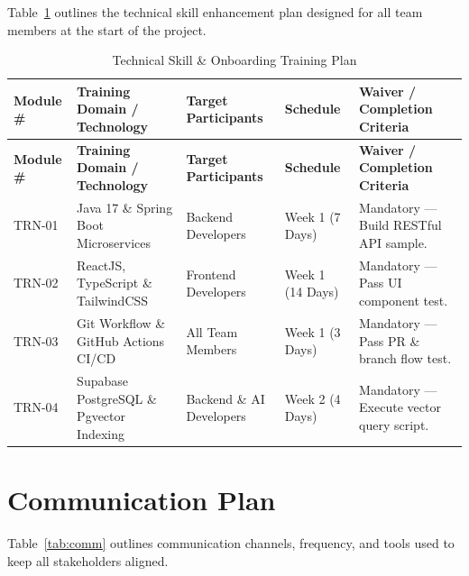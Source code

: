 Table~\ref{tab:training} outlines the technical skill enhancement plan designed for
all team members at the start of the project.

\begin{footnotesize}
\begin{longtable}{|p{1.4cm}|p{3.2cm}|p{2.3cm}|p{2cm}|p{3cm}|}
\caption{Technical Skill \& Onboarding Training Plan}\label{tab:training}\\
\hline
\hline
\textbf{Module \#} & \textbf{Training Domain / Technology} & \textbf{Target Participants} & \textbf{Schedule} & \textbf{Waiver / Completion Criteria} \\
\hline
\hline
\endfirsthead
\hline
\textbf{Module \#} & \textbf{Training Domain / Technology} & \textbf{Target Participants} & \textbf{Schedule} & \textbf{Waiver / Completion Criteria} \\
\hline
\hline
\endhead
TRN-01 & Java 17 \& Spring Boot Microservices & Backend Developers & Week 1 (7 Days) & Mandatory --- Build RESTful API sample. \\
\hline
TRN-02 & ReactJS, TypeScript \& TailwindCSS & Frontend Developers & Week 1 (14 Days) & Mandatory --- Pass UI component test. \\
\hline
TRN-03 & Git Workflow \& GitHub Actions CI/CD & All Team Members & Week 1 (3 Days) & Mandatory --- Pass PR \& branch flow test. \\
\hline
TRN-04 & Supabase PostgreSQL \& Pgvector Indexing & Backend \& AI Developers & Week 2 (4 Days) & Mandatory --- Execute vector query script. \\
\hline
\hline
\end{longtable}
\end{footnotesize}

\section{Communication Plan}

Table~\ref{tab:comm} outlines communication channels, frequency, and tools used to
keep all stakeholders aligned.

